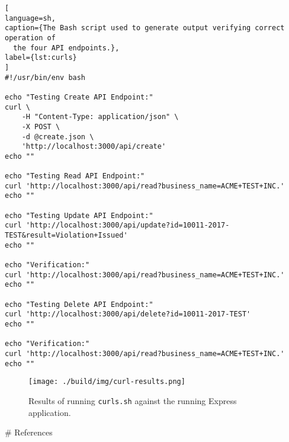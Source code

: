 \begin{lstlisting}[
language=sh,
caption={The Bash script used to generate output verifying correct operation of
  the four API endpoints.},
label={lst:curls}
]
#!/usr/bin/env bash

echo "Testing Create API Endpoint:"
curl \
    -H "Content-Type: application/json" \
    -X POST \
    -d @create.json \
    'http://localhost:3000/api/create'
echo ""

echo "Testing Read API Endpoint:"
curl 'http://localhost:3000/api/read?business_name=ACME+TEST+INC.'
echo ""

echo "Testing Update API Endpoint:"
curl 'http://localhost:3000/api/update?id=10011-2017-TEST&result=Violation+Issued'
echo ""

echo "Verification:"
curl 'http://localhost:3000/api/read?business_name=ACME+TEST+INC.'
echo ""

echo "Testing Delete API Endpoint:"
curl 'http://localhost:3000/api/delete?id=10011-2017-TEST'
echo ""

echo "Verification:"
curl 'http://localhost:3000/api/read?business_name=ACME+TEST+INC.'
echo ""
\end{lstlisting}

\begin{figure}[htbp]
  \texttt{[image: ./build/img/curl-results.png]}
  \caption{Results of running \texttt{curls.sh} against the running Express
    application.}
  \label{fig:curl-results}
\end{figure}

\pagebreak

# References
